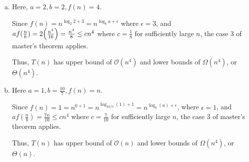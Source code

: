 \documentclass[12pt]{article}
\begin{document}
\begin{enumerate}[1.]
    \begin{enumerate}[a)]
        \item

        Here, $a = 2, b = 2, f(n) = 4$.

        \bigskip

        Since $f(n) = n^{\log_2 2 + 3} = n^{\log_b a + \epsilon}$ where $\epsilon = 3$,
        and $af(\frac{n}{b}) = 2\Bigl( \frac{n^4}{16} \Bigr) = \frac{n^4}{8} \leq cn^4$ where
        $c = \frac{1}{8}$ for sufficiently large $n$, the case 3 of master's theorem applies.

        \bigskip

        Thus, $T(n)$ has upper bound of $\mathcal{O}(n^4)$ and lower bounds of $\Omega(n^4)$, or $\Theta(n^4)$.

        \bigskip

        \item

        Here $a = 1, b = \frac{10}{7}, f(n) = n$.

        \bigskip

        Since $f(n) = 1 = n^{0 + 1} = n^{\log_{10/7} (1) + 1}=n^{\log_b (a) + \epsilon}$, where $\epsilon = 1$,
        and $af(\frac{n}{b}) =\frac{7n}{10} \leq cn^4$ where
        $c = \frac{7}{10}$ for sufficiently large $n$, the case 3 of master's theorem applies.

        \bigskip

        Thus, $T(n)$ has upper bound of $\mathcal{O}(n)$ and lower bounds of $\Omega(n^4)$, or $\Theta(n)$.



    \end{enumerate}


\end{enumerate}
\end{document}
